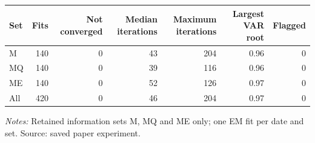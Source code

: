 \begin{threeparttable}
\begin{tabular}{lrrrrrr}
\toprule
Set & Fits & Not converged & Median iterations & Maximum iterations & Largest VAR root & Flagged \\
\midrule
M & 140 & 0 & 43 & 204 & 0.96 & 0 \\
MQ & 140 & 0 & 39 & 116 & 0.96 & 0 \\
ME & 140 & 0 & 52 & 126 & 0.97 & 0 \\
All & 420 & 0 & 46 & 204 & 0.97 & 0 \\
\bottomrule
\end{tabular}
\begin{tablenotes}[flushleft]\footnotesize
\item \textit{Notes:} Retained information sets M, MQ and ME only; one EM fit per date and set. Source: saved paper experiment.
\end{tablenotes}
\end{threeparttable}
